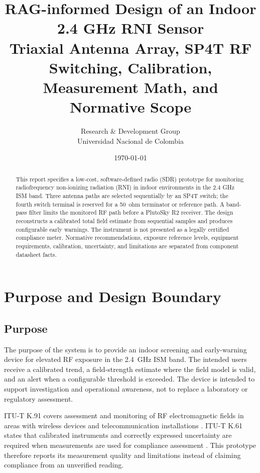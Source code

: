 \documentclass[11pt,a4paper]{article}
\title{\textbf{\LARGE\color{primary} RAG-informed Design of an Indoor 2.4 GHz RNI Sensor}\\[0.4em]
\large\color{secondary} Triaxial Antenna Array, SP4T RF Switching, Calibration, Measurement Math, and Normative Scope}
\author{Research \& Development Group\\Universidad Nacional de Colombia}
\date{\today}
\begin{document}
\maketitle
\thispagestyle{plain}

\begin{abstract}
This report specifies a low-cost, software-defined radio (SDR) prototype for monitoring radiofrequency non-ionizing radiation (RNI) in indoor environments in the 2.4 GHz ISM band. Three antenna paths are selected sequentially by an SP4T switch; the fourth switch terminal is reserved for a 50~ohm terminator or reference path. A band-pass filter limits the monitored RF path before a PlutoSky R2 receiver. The design reconstructs a calibrated total field estimate from sequential samples and produces configurable early warnings. The instrument is not presented as a legally certified compliance meter. Normative recommendations, exposure reference levels, equipment requirements, calibration, uncertainty, and limitations are separated from component datasheet facts.
\end{abstract}

\tableofcontents
\newpage

\section{Purpose and Design Boundary}

\subsection{Purpose}
The purpose of the system is to provide an indoor screening and early-warning device for elevated RF exposure in the 2.4~GHz ISM band. The intended users receive a calibrated trend, a field-strength estimate where the field model is valid, and an alert when a configurable threshold is exceeded. The device is intended to support investigation and operational awareness, not to replace a laboratory or regulatory assessment.

ITU-T K.91 covers assessment and monitoring of RF electromagnetic fields in areas with wireless devices and telecommunication installations \cite{ITU-T-K.91}. ITU-T K.61 states that calibrated instruments and correctly expressed uncertainty are required when measurements are used for compliance assessment \cite{ITU-T-K.61}. This prototype therefore reports its measurement quality and limitations instead of claiming compliance from an unverified reading.
\end{document}
